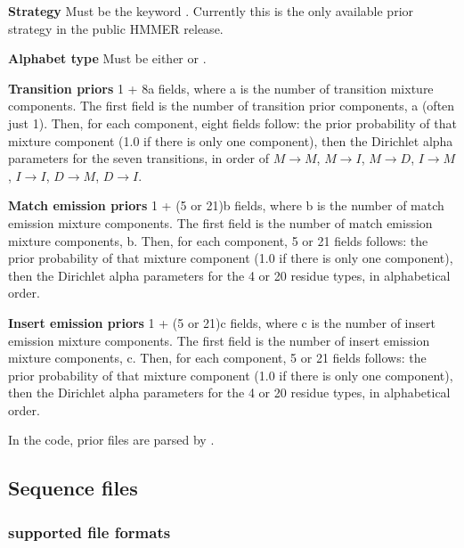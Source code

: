 \begin{wideitem}
\item [\textbf{Strategy}] Must be the keyword . Currently 
this is the only available prior strategy in the public HMMER release.

\item [\textbf{Alphabet type}] Must be either  or
.

\item [\textbf{Transition priors}] 1 + 8a fields, where a
is the number of transition mixture components. The first field is the
number of transition prior components, a (often just 1). Then, for each
component, eight fields follow: the prior probability of that mixture
component (1.0 if there is only one component), then the Dirichlet
alpha parameters for the seven transitions, in order of $M \rightarrow
M$, $M \rightarrow I$, $M \rightarrow D$, $I \rightarrow M$, $I
\rightarrow I$, $D \rightarrow M$, $D \rightarrow I$.

\item [\textbf{Match emission priors}] 1 + (5 or 21)b fields,
where b is the number of match emission mixture components.  The first
field is the number of match emission mixture components, b. Then, for
each component, 5 or 21 fields follows: the prior probability of that
mixture component (1.0 if there is only one component), then the
Dirichlet alpha parameters for the 4 or 20 residue types, in
alphabetical order.

\item [\textbf{Insert emission priors}] 1 + (5 or 21)c fields,
where c is the number of insert emission mixture components.  The
first field is the number of insert emission mixture components,
c. Then, for each component, 5 or 21 fields follows: the prior
probability of that mixture component (1.0 if there is only one
component), then the Dirichlet alpha parameters for the 4 or 20
residue types, in alphabetical order.
\end{wideitem}

In the code, prior files are parsed by .

\subsection{Sequence files}

\subsubsection{supported file formats}
 
